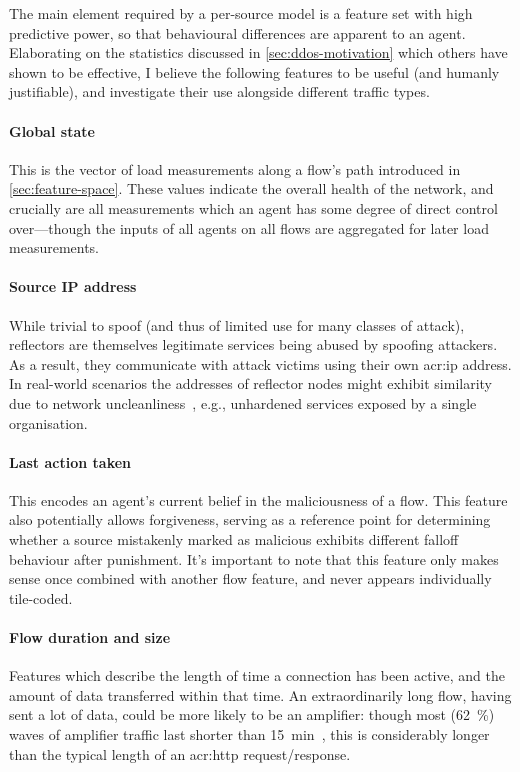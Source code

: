 The main element required by a per-source model is a feature set with high predictive power, so that behavioural differences are apparent to an agent.
Elaborating on the statistics discussed in \cref{sec:ddos-motivation} which others have shown to be effective, I believe the following features to be useful (and humanly justifiable), and investigate their use alongside different traffic types.

\paragraph{Global state}
This is the vector of load measurements along a flow's path introduced in \cref{sec:feature-space}.
These values indicate the overall health of the network, and crucially are all measurements which an agent has some degree of direct control over---though the inputs of all agents on all flows are aggregated for later load measurements.

\paragraph{Source IP address}
While trivial to spoof (and thus of limited use for many classes of attack), reflectors are themselves legitimate services being abused by spoofing attackers.
As a result, they communicate with attack victims using their own \gls{acr:ip} address.
In real-world scenarios the addresses of reflector nodes might exhibit similarity due to network uncleanliness~\parencite{DBLP:conf/imc/CollinsSFJWSK07}, e.g., unhardened services exposed by a single organisation.

\paragraph{Last action taken}
This encodes an agent's current belief in the maliciousness of a flow.
This feature also potentially allows forgiveness, serving as a reference point for determining whether a source mistakenly marked as malicious exhibits different falloff behaviour after punishment.
It's important to note that this feature only makes sense once combined with another flow feature, and never appears individually tile-coded.

\paragraph{Flow duration and size}
Features which describe the length of time a connection has been active, and the amount of data transferred within that time.
An extraordinarily long flow, having sent a lot of data, could be more likely to be an amplifier: though most (\qty{62}{\percent}) waves of amplifier traffic last shorter than \qty{15}{\minute}~\parencite{DBLP:conf/raid/KramerKMNKYR15}, this is considerably longer than the typical length of an \gls{acr:http} request/response.

